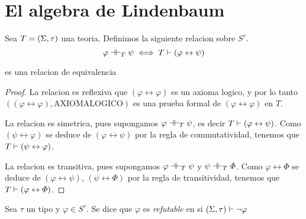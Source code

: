 \section{El algebra de Lindenbaum}
\begin{definition}
  Sea $T=(\Sigma,\tau)$ una teoria. Definimos la siguiente relacion sobre $S^\tau$.
  $$
  \varphi\dashv\vdash_{T}\psi \iff T\vdash\left(\varphi\leftrightarrow\psi\right)
  $$
\end{definition}

\begin{lemma}
  \trel es una relacion de equivalencia
\end{lemma}
\begin{proof}
  La relacion es reflexiva que $(\varphi\leftrightarrow\varphi)$ es un axioma logico, y por lo tanto\\
  $((\varphi\leftrightarrow\varphi),\text{AXIOMALOGICO})$ es una prueba formal de $(\varphi\leftrightarrow\varphi)$ en $T$.
  
  La relacion es simetrica, pues supongamos $\varphi\dashv\vdash_{T}\psi$, es decir $T\vdash(\varphi\leftrightarrow\psi)$. Como 
  $(\psi\leftrightarrow\varphi)$ se deduce de $(\varphi\leftrightarrow\psi)$ por la regla de commutatividad, tenemos que $T\vdash(\psi\leftrightarrow\varphi)$.

  La relacion es transitiva, pues supongamos $\varphi\dashv\vdash_{T}\psi$ y $\psi\dashv\vdash_{T}\varPhi$. Como $\varphi\leftrightarrow\varPhi$
  se deduce de $(\varphi\leftrightarrow\psi)$, $(\psi\leftrightarrow\varPhi)$ por la regla de transitividad, tenemos que $T\vdash(\varphi\leftrightarrow\varPhi)$.
\end{proof}

\begin{definition}
  Sea $\tau$ un tipo y $\varphi\in S^\tau$. Se dice que $\varphi$ es \emph{refutable} en \forder si $(\Sigma,\tau)\vdash\neg\varphi$
\end{definition}

